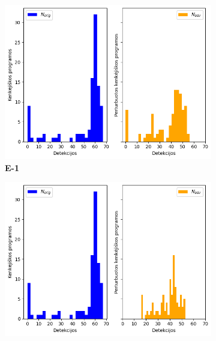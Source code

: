 
\label{app:experiment}
\begin{figure}[h]
    \begin{small}
        \begin{center}
            \begin{subfigure}[t]{0.48\textwidth}
                \centering
                \includegraphics[width=\textwidth]{img/det_distributions_paper.png}
                \caption{\textbf{E-1}}
            \end{subfigure}
            \hfill
            \begin{subfigure}[t]{0.48\textwidth}
                \centering
                \includegraphics[width=\textwidth]{img/det_distributions.png}

\end{subfigure}
\end{center}
\end{small}
\end{figure}
